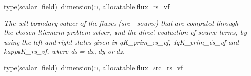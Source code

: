 \textbf{ }\par
\begin{DoxyCompactItemize}
\item 
type(\hyperlink{structm__derived__types_1_1scalar__field}{scalar\+\_\+field}), dimension(\+:), allocatable \hyperlink{namespacem__riemann__solvers_a3d8e1f9ad9ca68e97109e0cff7aa1c4b}{flux\+\_\+rs\+\_\+vf}
\begin{DoxyCompactList}\small\item\em The cell-\/boundary values of the fluxes (src -\/ source) that are computed through the chosen Riemann problem solver, and the direct evaluation of source terms, by using the left and right states given in q\+K\+\_\+prim\+\_\+rs\+\_\+vf, dq\+K\+\_\+prim\+\_\+ds\+\_\+vf and kappa\+K\+\_\+rs\+\_\+vf, where ds = dx, dy or dz. \end{DoxyCompactList}\item 
type(\hyperlink{structm__derived__types_1_1scalar__field}{scalar\+\_\+field}), dimension(\+:), allocatable \hyperlink{namespacem__riemann__solvers_a0b6d2f192a1df76abc59b85b03f7a187}{flux\+\_\+src\+\_\+rs\+\_\+vf}
\end{DoxyCompactItemize}

